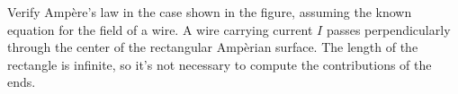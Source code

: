 Verify Amp\`{e}re's law in the case shown in the figure, assuming the known equation for
the field of a wire. A wire carrying current $I$ passes perpendicularly through the center of the rectangular
Amp\`{e}rian surface. The length of the rectangle is infinite, so it's not necessary to
compute the contributions of the ends.
